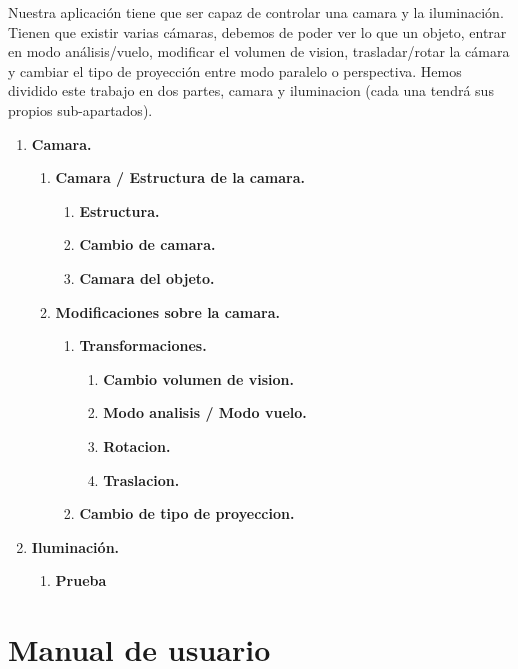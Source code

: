 \documentclass[12pt,a4paper]{article}
\begin{document}
Nuestra aplicación tiene que ser capaz de controlar una camara y la iluminación.
Tienen que existir varias cámaras, debemos de poder ver lo que un objeto, entrar en modo análisis/vuelo, modificar el volumen de vision, trasladar/rotar la cámara y cambiar el tipo de proyección entre modo paralelo o perspectiva.\newline
Hemos dividido este trabajo en dos partes, camara y iluminacion (cada una tendrá sus propios sub-apartados).
\begin{enumerate}
\item \textbf{Camara.}
\begin{enumerate}
\item \textbf{Camara / Estructura de la camara.}
\begin{enumerate}
\item \textbf{Estructura.}
\item \textbf{Cambio de camara.}
\item \textbf{Camara del objeto.}
\end{enumerate}
\item \textbf{Modificaciones sobre la camara.}
\begin{enumerate}
\item \textbf{Transformaciones.}
\begin{enumerate}
\item \textbf{Cambio volumen de vision.}
\item \textbf{Modo analisis / Modo vuelo.}
\item \textbf{Rotacion.}
\item \textbf{Traslacion.}
\end{enumerate}
\item \textbf{Cambio de tipo de proyeccion.}
\end{enumerate}
\end{enumerate}
\item \textbf{Iluminación.}
\begin{enumerate}
\item \textbf{Prueba}
\end{enumerate}
\end{enumerate}


\section{Manual de usuario}
\end{document}
